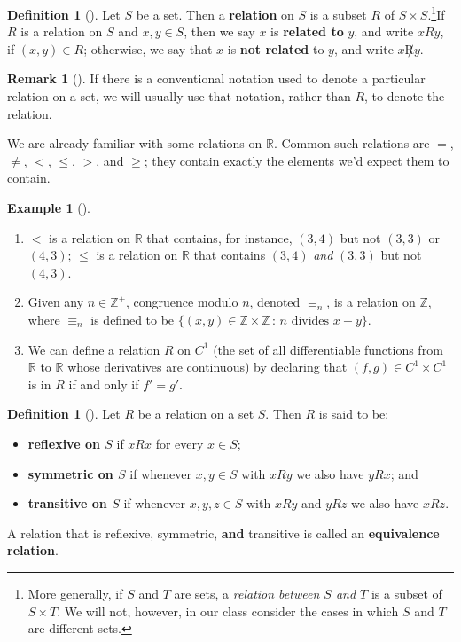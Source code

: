 \documentclass[10pt,]{book}
\newcommand{\terminology}[1]{\textbf{#1}}
\theoremstyle{plain}
\theoremstyle{definition}
\newtheorem{definition}[theorem]{Definition}
\theoremstyle{definition}
\newtheorem{remark}[theorem]{Remark}
\theoremstyle{definition}
\newtheorem{example}[theorem]{Example}
\theoremstyle{definition}
\numberwithin{equation}{section}
\def\Z{\mathbb{Z}}
\def\R{\mathbb{R}}
\newcommand{\lt}{<}
\begin{document}
\begin{definition}[{}]\label{definition-55}
Let \(S\) be a set. Then a \terminology{relation} on \(S\) is a subset \(R\) of \(S\times S\).\footnote{More generally, if \(S\) and \(T\) are sets, a \emph{relation between \(S\) and \(T\)} is a subset of \(S \times T\). We will not, however, in our class consider the cases in which \(S\) and \(T\) are different sets.\label{fn-6}}If \(R\) is a relation on \(S\) and \(x,y\in S\), then we say \(x\) is \terminology{related to} \(y\), and write \(x R y\), if \((x,y)\in R\); otherwise, we say that \(x\) is \terminology{not related} to \(y\), and write \(x \not R y\).%
\end{definition}
\begin{remark}[]\label{remark-32}
If there is a conventional notation used to denote a particular relation on a set, we will usually use that notation, rather than \(R\), to denote the relation.%
\end{remark}
We are already familiar with some relations on \(\R\). Common such relations are \(=\), \(\neq\), \(\lt\), \(\leq\), \(>\), and \(\geq\); they contain exactly the elements we'd expect them to contain.%
\begin{example}[]\label{example-64}
\leavevmode%
\begin{enumerate}
\item\hypertarget{li-378}{}\(\lt\) is a relation on \(\R\) that contains, for instance, \((3,4)\) but not \((3,3)\) or \((4,3)\); \(\leq\) is a relation on \(\R\) that contains \((3,4)\) \emph{and} \((3,3)\) but not \((4,3)\).%
\item\hypertarget{li-379}{}Given any \(n\in \Z^+\), congruence modulo \(n\), denoted \(\equiv_n\), is a relation on \(\Z\), where \(\equiv_n\) is defined to be \(\{(x,y) \in \Z
\times \Z \,:\, n \mbox{ divides } x-y\}\).%
\item\hypertarget{li-380}{}We can define a relation \(R\) on \(C^1\) (the set of all differentiable functions from \(\R\) to \(\R\) whose derivatives are continuous) by declaring that \((f,g)\in C^1 \times C^1\) is in \(R\) if and only if \(f'=g'\).%
\end{enumerate}
\end{example}
\begin{definition}[{}]\label{definition-56}
Let \(R\) be a relation on a set \(S\). Then \(R\) is said to be:%
\leavevmode%
\begin{itemize}[label=\textbullet]
\item{}\terminology{reflexive on \(S\)} if \(xR x\) for every \(x\in S\);%
\item{}\terminology{symmetric on \(S\)} if whenever \(x,y\in S\) with \(xR y\) we also have \(yR x\); and%
\item{}\terminology{transitive on \(S\)} if whenever \(x,y,z\in S\) with \(xR y\) and \(yR z\) we also have \(xR z\).%
\end{itemize}
A relation that is reflexive, symmetric, \terminology{and} transitive is called an \terminology{equivalence relation}.%
\end{definition}
\end{document}
